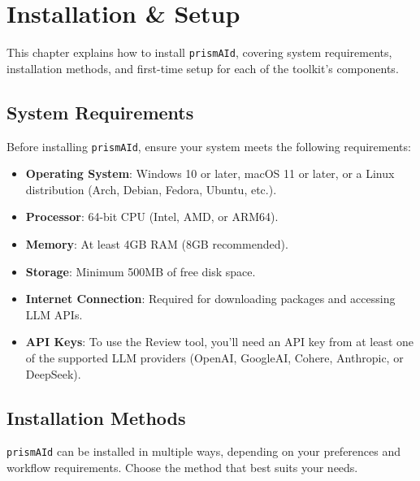 \chapter{Installation \& Setup}
\label{chap:install}

This chapter explains how to install \texttt{prismAId}, covering system requirements, installation methods, and first-time setup for each of the toolkit's components.

\section{System Requirements}

Before installing \texttt{prismAId}, ensure your system meets the following requirements:

\begin{itemize}
    \item \textbf{Operating System}: Windows 10 or later, macOS 11 or later, or a Linux distribution (Arch, Debian, Fedora, Ubuntu, etc.).
    \item \textbf{Processor}: 64-bit CPU (Intel, AMD, or ARM64).
    \item \textbf{Memory}: At least 4GB RAM (8GB recommended).
    \item \textbf{Storage}: Minimum 500MB of free disk space.
    \item \textbf{Internet Connection}: Required for downloading packages and accessing LLM APIs.
    \item \textbf{API Keys}: To use the Review tool, you'll need an API key from at least one of the supported LLM providers (OpenAI, GoogleAI, Cohere, Anthropic, or DeepSeek).
\end{itemize}

\section{Installation Methods}

\texttt{prismAId} can be installed in multiple ways, depending on your preferences and workflow requirements.
 Choose the method that best suits your needs.

